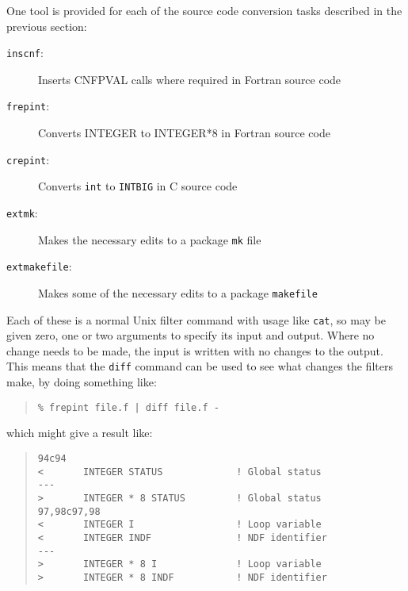 \documentclass[twoside,11pt]{article}
\newcommand{\htmlref}[2]{#1}
\renewcommand{\_}{\texttt{\symbol{95}}}
\newcommand{\xroutine}[1]{\htmlref{{\tt #1}}{#1}}
\newcommand{\file}[1]{{\tt #1}}
\newcommand{\cc}[1]{{\tt #1}}
\newenvironment{squote}{\begin{quote}\begin{small}}{\end{small}\end{quote}}
\begin{document}
One tool is provided for each of the source code conversion
tasks described in the previous section:
\begin{description}
\item[\xroutine{inscnf}:] Inserts CNF\_PVAL calls where required in Fortran source code
\item[\xroutine{frepint}:] 
     Converts INTEGER to INTEGER*8 in Fortran source code
\item[\xroutine{crepint}:] 
     Converts \cc{int} to \cc{INT\_BIG} in C source code
\item[\xroutine{extmk}:] 
     Makes the necessary edits to a package \file{mk} file
\item[\xroutine{extmakefile}:]
     Makes some of the necessary edits to a package \file{makefile}
\end{description}
Each of these is a normal Unix filter command with usage like \file{cat}, 
so may be given zero, one or two arguments to specify its input and output.
Where no change needs to be made, the input is written with no changes 
to the output.  This means that the \file{diff} command can be used 
to see what changes the filters make, by doing something like:
\begin{squote}
\begin{verbatim}
% frepint file.f | diff file.f -
\end{verbatim}
\end{squote}
which might give a result like:
\begin{squote}
\begin{verbatim}
94c94
<       INTEGER STATUS             ! Global status
---
>       INTEGER * 8 STATUS         ! Global status
97,98c97,98
<       INTEGER I                  ! Loop variable
<       INTEGER INDF               ! NDF identifier
---
>       INTEGER * 8 I              ! Loop variable
>       INTEGER * 8 INDF           ! NDF identifier
\end{verbatim}
\end{squote}
\end{document}
